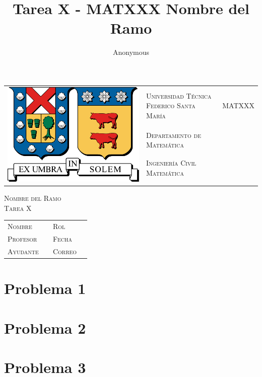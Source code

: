 \documentclass[letterpaper,12pt]{article}
\title{Tarea X - MATXXX Nombre del Ramo}
\author{ Anonymous }
\begin{document}
{\small
\begin{tabular}{llr}
    \multirow{4}{*}{\includegraphics[scale=0.12]{utfsm.pdf}} & \textsc{Universidad Técnica Federico Santa María} & \hspace{3em} \multirow{3}{*} {\large \textsc{MATXXX}} \\
    &  \textsc{Departamento de Matemática} \\
    &  \textsc{Ingeniería Civil Matemática} \\
    &
\end{tabular}
}

\begin{center}
    \huge{\textsc{Nombre del Ramo\\Tarea X}}
\end{center}

\vspace{1em}

\begin{tabular}{llll}
    \textsc{Nombre} &  & \textsc{Rol} & \\
    \textsc{Profesor} &  & \textsc{Fecha} & \\
    \textsc{Ayudante} &  & \textsc{Correo} &
\end{tabular}

\section*{Problema 1}
\vspace{0.8em}
    
\clearpage

\section*{Problema 2}
\vspace{0.8em}
    
\clearpage

\section*{Problema 3}
\vspace{0.8em}
    
\clearpage
\end{document}
